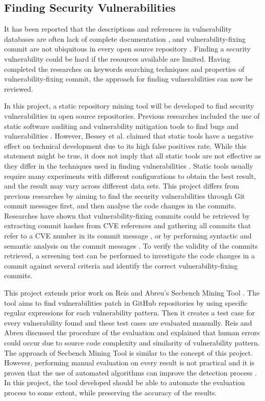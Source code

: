 \documentclass[12pt, a4paper]{report}
\begin{document}
\subsection{Finding Security Vulnerabilities} \label{subsec:finding_vuln}
It has been reported that the descriptions and references in vulnerability databases are often lack
of complete documentation \cite{massacci_2010}, and vulnerability-fixing commit are not ubiquitous
in every open source repository \cite{walden_2014}. Finding a security vulnerability could be hard
if the resources available are limited. Having completed the researches on keywords searching
techniques and properties of vulnerability-fixing commit, the approach for finding vulnerabilities
can now be reviewed.

In this project, a static repository mining tool will be developed to find security vulnerabilities
in open source repositories. Previous researches included the use of static software auditing and
vulnerability mitigation tools to find bugs and vulnerabilities \cite{cowan_2003}. However, Bessey
et al. \cite{bessey_2010} claimed that static tools have a negative effect on technical development
due to its high false positives rate. While this statement might be true, it does not imply that all
static tools are not effective as they differ in the techniques used in finding vulnerabilities
\cite{moser_2008}. Static tools usually require many experiments with different configurations to
obtain the best result, and the result may vary across different data sets. This project differs
from previous researches by aiming to find the security vulnerabilities through Git commit messages
first, and then analyse the code changes in the commits. Researches have shown that
vulnerability-fixing commits could be retrieved by extracting commit hashes from CVE references and
gathering all commits that refer to a CVE number in its commit message \cite{jimenez_2016}, or by
performing syntactic and semantic analysis on the commit messages \cite{sliwerski_2005}. To verify
the validity of the commits retrieved, a screening test \cite{dashevskyi_2018} can be performed to
investigate the code changes in a commit against several criteria and identify the correct
vulnerability-fixing commits.

This project extends prior work on Reis and Abreu's Secbench Mining Tool \cite{secbench}. The tool
aims to find vulnerabilities patch in GitHub repositories by using specific regular expressions for
each vulnerability pattern. Then it creates a test case for every vulnerability found and these test
cases are evaluated manually. Reis and Abreu \cite{reis_2017} discussed the procedure of the
evaluation and explained that human errors could occur due to source code complexity and similarity
of vulnerability pattern. The approach of Secbench Mining Tool is similar to the concept of this
project. However, performing manual evaluation on every result is not practical and it is proven
that the use of automated algorithms can improve the detection process \cite{livshits_2005}. In this
project, the tool developed should be able to automate the evaluation process to some extent, while
preserving the accuracy of the results.
\end{document}
